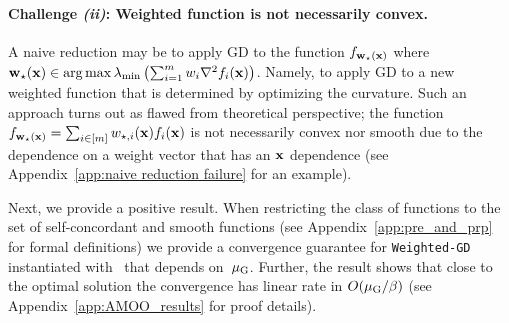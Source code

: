 \paragraph{Challenge \emph{(ii)}: Weighted function is not necessarily convex.} A naive reduction may be to apply GD to the function $f_{{\mathbf{w}}_\star({\mathbf{x}})}$ where ${\mathbf{w}}_\star({\mathbf{x}})\in \arg\max \lambda_{\min}\left(\sum_{i=1}^m w_i \nabla^2 f_i({\mathbf{x}}) \right)$. Namely, to apply GD to a new weighted function that is determined by optimizing the curvature. Such an approach turns out as flawed from theoretical perspective; the function $f_{{\mathbf{w}}_\star({\mathbf{x}})}=\sum_{i\in [m]} w_{\star,i}({\mathbf{x}}) f_i({\mathbf{x}})$ is not necessarily convex nor smooth due to the dependence on a weight vector that has an ${\mathbf{x}}$ dependence (see Appendix~\ref{app:naive reduction failure} for an example).

Next, we provide a positive result. When restricting the class of functions to the set of self-concordant and smooth functions (see Appendix~\ref{app:pre_and_prp} for formal definitions) we provide a convergence guarantee for \texttt{Weighted-GD} instantiated with \CAMOO\ that depends on~${\mu_{\mathrm{G}}}$. Further, the result shows that close to the optimal solution the convergence has linear rate in $O({\mu_{\mathrm{G}}}/\beta)$ (see Appendix~\ref{app:AMOO_results} for proof details). 


